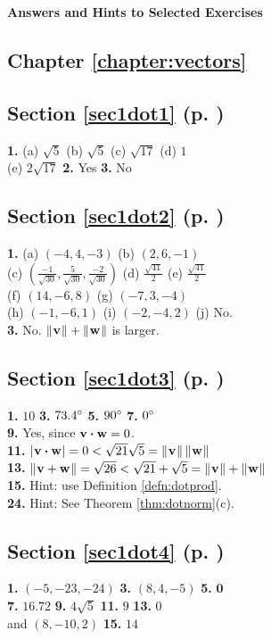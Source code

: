 \textsf{\textbf{\Large Answers and Hints to Selected Exercises}}
\begin{multicols}{2}
\section*{Chapter \ref{chapter:vectors}}
\subsection*{Section \ref{sec1dot1} (p. \pageref{sec1dot1})}
\textbf{1.} (a) $\sqrt{5}$ \quad (b) $\sqrt{5}$ \quad (c) $\sqrt{17}$ \quad (d) $1$\\(e) $2 \sqrt{17}$ \quad \textbf{2.}
Yes \quad \textbf{3.} No
\subsection*{Section \ref{sec1dot2} (p. \pageref{sec1dot2})}
\textbf{1.} (a) $(-4,4,-3)$ \quad (b) $(2,6,-1)$\\(c) $\left ( \frac{-1}{\sqrt{30}},\frac{5}{\sqrt{30}},
\frac{-2}{\sqrt{30}}\right )$ \quad (d) $\frac{\sqrt{41}}{2}$ \quad (e) $\frac{\sqrt{41}}{2}$\\(f) $(14,-6,8)$ \quad
(g) $(-7,3,-4)$\\(h) $(-1,-6,1)$ \quad (i) $(-2,-4,2)$ \quad (j) No.\\\textbf{3.} No. $\lVert\mspace{1mu}\textbf{v}\mspace{1mu}\rVert +
\lVert\mspace{1mu}\textbf{w}\mspace{1mu}\rVert$ is larger.
\subsection*{Section \ref{sec1dot3} (p. \pageref{sec1dot3})}
\textbf{1.} $10$ \quad \textbf{3.} $73.4^\circ$ \quad \textbf{5.} $90^\circ$ \quad \textbf{7.} $0^\circ$\\
\textbf{9.} Yes, since $\textbf{v} \bm{\cdot} \textbf{w} = 0$.\\\textbf{11.} $\lvert\mspace{1mu}\textbf{v} \bm{\cdot} \textbf{w}\mspace{1mu}\rvert =
0 < \sqrt{21}\sqrt{5} = \lVert\mspace{1mu}\textbf{v}\mspace{1mu}\rVert\,\lVert\mspace{1mu}\textbf{w}\mspace{1mu}\rVert$\\\textbf{13.} $\lVert\mspace{1mu}\textbf{v} + \textbf{w}\mspace{1mu}\rVert = \sqrt{26}
< \sqrt{21} + \sqrt{5} = \lVert\mspace{1mu}\textbf{v}\mspace{1mu}\rVert + \lVert\mspace{1mu}\textbf{w}\mspace{1mu}\rVert$\\\textbf{15.} Hint: use Definition
\ref{defn:dotprod}.\\
\textbf{24.} Hint: See Theorem \ref{thm:dotnorm}(c).
\subsection*{Section \ref{sec1dot4} (p. \pageref{sec1dot4})}
\textbf{1.} $(-5,-23,-24)$ \quad \textbf{3.} $(8,4,-5)$ \quad \textbf{5.} $\textbf{0}$\\\textbf{7.} $16.72$ \quad
\textbf{9.} $4\sqrt{5}$ \quad \textbf{11.} $9$ \quad \textbf{13.} $0$\\and $(8,-10,2)$ \quad \textbf{15.} $14$

\end{multicols}
